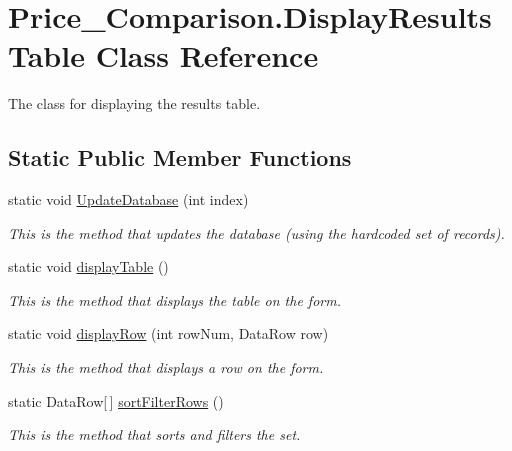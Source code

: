 \hypertarget{class_price___comparison_1_1_display_results_table}{\section{Price\-\_\-\-Comparison.\-Display\-Results\-Table Class Reference}
\label{class_price___comparison_1_1_display_results_table}
}


The class for displaying the results table.  


\subsection*{Static Public Member Functions}
\begin{DoxyCompactItemize}
\item 
static void \hyperlink{class_price___comparison_1_1_display_results_table_a59a0ea811b7981d8fd7fd7e569d7dc25}{Update\-Database} (int index)
\begin{DoxyCompactList}\small\item\em This is the method that updates the database (using the hardcoded set of records). \end{DoxyCompactList}\item 
static void \hyperlink{class_price___comparison_1_1_display_results_table_a80b6c08a37fffa730d08808f8a6add30}{display\-Table} ()
\begin{DoxyCompactList}\small\item\em This is the method that displays the table on the form. \end{DoxyCompactList}\item 
static void \hyperlink{class_price___comparison_1_1_display_results_table_ad7ae949acd95974340b752b664f6b59e}{display\-Row} (int row\-Num, Data\-Row row)
\begin{DoxyCompactList}\small\item\em This is the method that displays a row on the form. \end{DoxyCompactList}\item 
static Data\-Row\mbox{[}$\,$\mbox{]} \hyperlink{class_price___comparison_1_1_display_results_table_aa70ac8b10e811245544396730c2293da}{sort\-Filter\-Rows} ()
\begin{DoxyCompactList}\small\item\em This is the method that sorts and filters the set. \end{DoxyCompactList}\item 

\end{DoxyCompactItemize}
